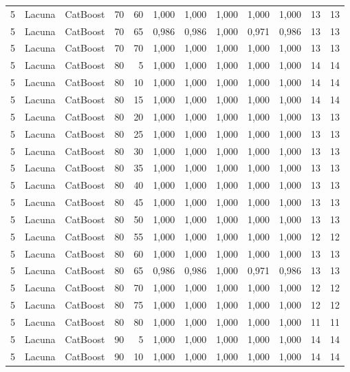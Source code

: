 \begin{longtable}{@{}rllrrrrrrrrr@{}}
5 & Lacuna & CatBoost & 70 & 60 & 1,000 & 1,000 & 1,000 & 1,000 & 1,000 & 13 & 13 \\
5 & Lacuna & CatBoost & 70 & 65 & 0,986 & 0,986 & 1,000 & 0,971 & 0,986 & 13 & 13 \\
5 & Lacuna & CatBoost & 70 & 70 & 1,000 & 1,000 & 1,000 & 1,000 & 1,000 & 13 & 13 \\
5 & Lacuna & CatBoost & 80 & 5 & 1,000 & 1,000 & 1,000 & 1,000 & 1,000 & 14 & 14 \\
5 & Lacuna & CatBoost & 80 & 10 & 1,000 & 1,000 & 1,000 & 1,000 & 1,000 & 14 & 14 \\
5 & Lacuna & CatBoost & 80 & 15 & 1,000 & 1,000 & 1,000 & 1,000 & 1,000 & 14 & 14 \\
5 & Lacuna & CatBoost & 80 & 20 & 1,000 & 1,000 & 1,000 & 1,000 & 1,000 & 13 & 13 \\
5 & Lacuna & CatBoost & 80 & 25 & 1,000 & 1,000 & 1,000 & 1,000 & 1,000 & 13 & 13 \\
5 & Lacuna & CatBoost & 80 & 30 & 1,000 & 1,000 & 1,000 & 1,000 & 1,000 & 13 & 13 \\
5 & Lacuna & CatBoost & 80 & 35 & 1,000 & 1,000 & 1,000 & 1,000 & 1,000 & 13 & 13 \\
5 & Lacuna & CatBoost & 80 & 40 & 1,000 & 1,000 & 1,000 & 1,000 & 1,000 & 13 & 13 \\
5 & Lacuna & CatBoost & 80 & 45 & 1,000 & 1,000 & 1,000 & 1,000 & 1,000 & 13 & 13 \\
5 & Lacuna & CatBoost & 80 & 50 & 1,000 & 1,000 & 1,000 & 1,000 & 1,000 & 13 & 13 \\
5 & Lacuna & CatBoost & 80 & 55 & 1,000 & 1,000 & 1,000 & 1,000 & 1,000 & 12 & 12 \\
5 & Lacuna & CatBoost & 80 & 60 & 1,000 & 1,000 & 1,000 & 1,000 & 1,000 & 13 & 13 \\
5 & Lacuna & CatBoost & 80 & 65 & 0,986 & 0,986 & 1,000 & 0,971 & 0,986 & 13 & 13 \\
5 & Lacuna & CatBoost & 80 & 70 & 1,000 & 1,000 & 1,000 & 1,000 & 1,000 & 12 & 12 \\
5 & Lacuna & CatBoost & 80 & 75 & 1,000 & 1,000 & 1,000 & 1,000 & 1,000 & 12 & 12 \\
5 & Lacuna & CatBoost & 80 & 80 & 1,000 & 1,000 & 1,000 & 1,000 & 1,000 & 11 & 11 \\
5 & Lacuna & CatBoost & 90 & 5 & 1,000 & 1,000 & 1,000 & 1,000 & 1,000 & 14 & 14 \\
5 & Lacuna & CatBoost & 90 & 10 & 1,000 & 1,000 & 1,000 & 1,000 & 1,000 & 14 & 14 \\

\end{longtable}
